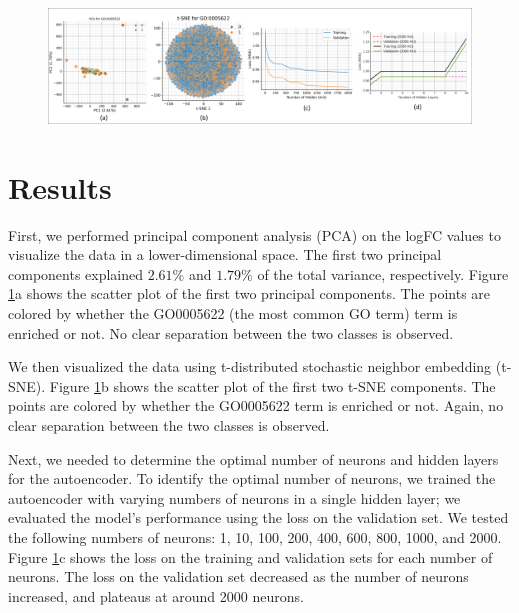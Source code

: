 
\begin{figure}[ht]
    \centering
    \includegraphics[width=\textwidth]{./images/results.png}
    \label{fig:results}
\end{figure}

\section{Results}

First, we performed principal component analysis (PCA) on the logFC values to visualize
the data in a lower-dimensional space. The first two principal components explained
$2.61\%$ and $1.79\%$ of the total variance, respectively. Figure \ref{fig:results}a shows
the scatter plot of the first two principal components. The points are colored by whether
the GO0005622 (the most common GO term) term is enriched or not. No clear separation
between the two classes is observed.

\vspace{0.2cm}

We then visualized the data using t-distributed stochastic neighbor embedding (t-SNE).
Figure \ref{fig:results}b shows the scatter plot of the first two t-SNE components. The
points are colored by whether the GO0005622 term is enriched or not. Again, no clear
separation between the two classes is observed.

\vspace{0.2cm}

Next, we needed to determine the optimal number of neurons and hidden layers for the
autoencoder. To identify the optimal number of neurons, we trained the autoencoder with
varying numbers of neurons in a single hidden layer; we evaluated the model's performance
using the loss on the validation set. We tested the following numbers of neurons: 1, 10,
100, 200, 400, 600, 800, 1000, and 2000. Figure \ref{fig:results}c shows the loss on the
training and validation sets for each number of neurons. The loss on the validation set
decreased as the number of neurons increased, and plateaus at around 2000 neurons.


